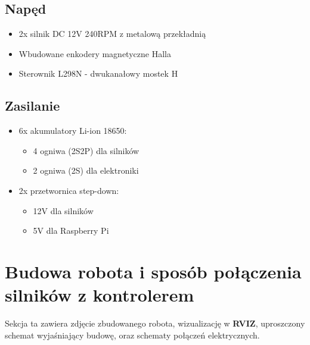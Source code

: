 \documentclass[a4paper,twoside,12pt]{book}
\begin{document}
\subsection{Napęd}
\begin{itemize}
\item 2x silnik DC 12V 240RPM z metalową przekładnią
\item Wbudowane enkodery magnetyczne Halla


\item Sterownik L298N - dwukanałowy mostek H \newline

\end{itemize}


\subsection{Zasilanie}
\begin{itemize}
\item 6x akumulatory Li-ion 18650:
	\begin{itemize}
	\item 4 ogniwa (2S2P) dla silników
	\item 2 ogniwa (2S) dla elektroniki
	\end{itemize}
	

\item 2x przetwornica step-down:
	\begin{itemize}
	\item 12V dla silników
	\item 5V dla Raspberry Pi
	\end{itemize}

		\newpage
\end{itemize}



\section{Budowa robota i sposób połączenia silników z kontrolerem}
Sekcja ta zawiera zdjęcie zbudowanego robota, wizualizację w \textbf{RVIZ}, uproszczony schemat wyjaśniający budowę, oraz schematy połączeń elektrycznych.
\end{document}

